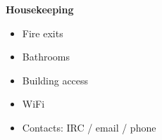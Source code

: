 \begin{frame}
  \begin{block}\textbf{Housekeeping}
\end{block}
\begin{center}
\begin{itemize}
  \item Fire exits
  \item Bathrooms
  \item Building access
  \item WiFi
  \item Contacts: IRC / email / phone
\end{itemize}
\end{center}
\end{frame}
